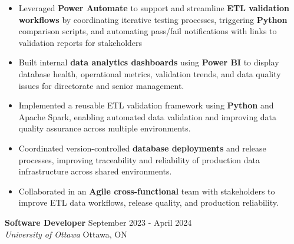 \documentclass[a4paper]{article}
\begin{document}
\begin{itemize} \itemsep -2pt
\item Leveraged \textbf{Power Automate} to support and streamline \textbf{ETL validation workflows} by coordinating iterative testing processes, triggering \textbf{Python} comparison scripts, and automating pass/fail notifications with links to validation reports for stakeholders
\item Built internal \textbf{data analytics dashboards} using \textbf{Power BI} to display database health, operational metrics, validation trends, and data quality issues for directorate and senior management.
\item Implemented a reusable ETL validation framework using \textbf{Python} and Apache Spark, enabling automated data validation and improving data quality assurance across multiple environments.
\item Coordinated version-controlled \textbf{database deployments} and release processes, improving traceability and reliability of production data infrastructure across shared environments.
\item Collaborated in an \textbf{Agile cross-functional} team with stakeholders to improve ETL data workflows, release quality, and production reliability.
\end{itemize}
\textbf{Software Developer} \hfill September 2023 - April 2024\\
\textit{University of Ottawa} \hfill Ottawa, ON\\
\vspace{-2mm}
\end{document}
